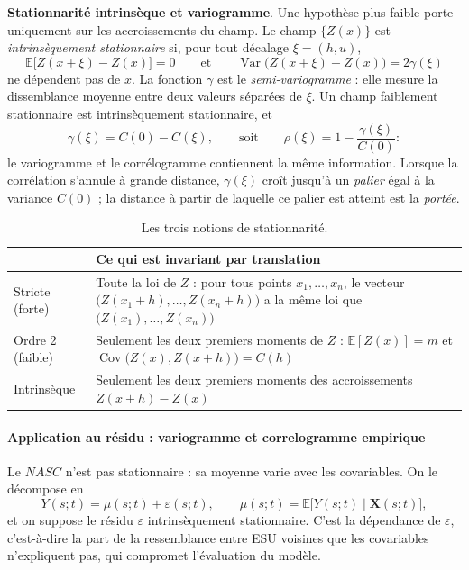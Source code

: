 	\textbf{Stationnarité intrinsèque et variogramme}.
	Une hypothèse plus faible porte uniquement sur les accroissements du champ. Le champ $\{Z(x)\}$ est \textit{intrinsèquement stationnaire} si, pour tout décalage $\xi = (h,u)$,
	\[
	\mathbb{E}\bigl[Z(x + \xi) - Z(x)\bigr] = 0
	\qquad\text{et}\qquad
	\operatorname{Var}\bigl(Z(x + \xi) - Z(x)\bigr) = 2\gamma(\xi)
	\]
	ne dépendent pas de $x$. La fonction $\gamma$ est le \textit{semi-variogramme} : elle mesure la dissemblance moyenne entre deux valeurs séparées de $\xi$. Un champ faiblement stationnaire est intrinsèquement stationnaire, et
	\[
	\gamma(\xi) = C(0) - C(\xi),
	\qquad\text{soit}\qquad
	\rho(\xi) = 1 - \frac{\gamma(\xi)}{C(0)} :
	\]
	le variogramme et le corrélogramme contiennent la même information. Lorsque la corrélation s'annule à grande distance, $\gamma(\xi)$ croît jusqu'à un \textit{palier} égal à la variance $C(0)$ ; la distance à partir de laquelle ce palier est atteint est la \textit{portée}.
	
	\begin{table}[htbp]
		\centering
		\begin{tabular}{@{}lp{}@{}}
			\toprule
			& \textbf{Ce qui est invariant par translation} \\
			\midrule
			Stricte (forte) &
			Toute la loi de $Z$ : pour tous points $x_1, \dots, x_n$, le vecteur
			$\bigl(Z(x_1+h), \dots, Z(x_n+h)\bigr)$ a la même loi que
			$\bigl(Z(x_1), \dots, Z(x_n)\bigr)$ \\
			\addlinespace
			Ordre 2 (faible) &
			Seulement les deux premiers moments de $Z$ :
			$\mathbb{E}[Z(x)] = m$ et $\operatorname{Cov}\bigl(Z(x), Z(x+h)\bigr) = C(h)$ \\
			\addlinespace
			Intrinsèque &
			Seulement les deux premiers moments des accroissements $Z(x+h) - Z(x)$ \\
			\bottomrule
		\end{tabular}
		\caption{Les trois notions de stationnarité.}
		\label{tab:stationnarite}
	\end{table}
	
	\paragraph{Application au résidu : variogramme et correlogramme empirique}
	Le $NASC$ n'est pas stationnaire : sa moyenne varie avec les covariables. On le décompose en
	\[
	Y(s;t) = \mu(s;t) + \varepsilon(s;t),
	\qquad
	\mu(s;t) = \mathbb{E}\bigl[Y(s;t) \mid \mathbf{X}(s;t)\bigr],
	\]
	et on suppose le résidu $\varepsilon$ intrinsèquement stationnaire. C'est la dépendance de $\varepsilon$, c'est-à-dire la part de la ressemblance entre ESU voisines que les covariables n'expliquent pas, qui compromet l'évaluation du modèle.
	
